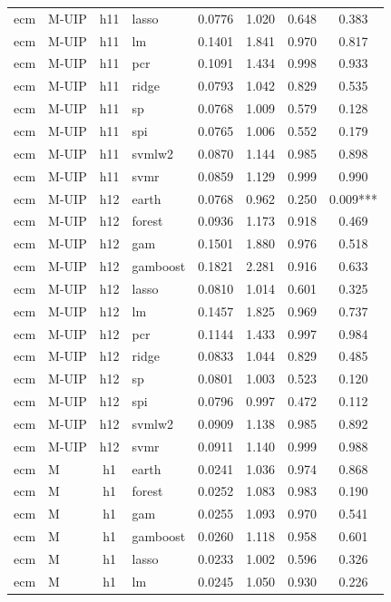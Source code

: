 \begin{ThreePartTable}
\begin{longtable}[t]{llclcccc}
ecm & M-UIP & h11 & lasso & 0.0776 & 1.020 & 0.648 & 0.383\\
ecm & M-UIP & h11 & lm & 0.1401 & 1.841 & 0.970 & 0.817\\
ecm & M-UIP & h11 & pcr & 0.1091 & 1.434 & 0.998 & 0.933\\
ecm & M-UIP & h11 & ridge & 0.0793 & 1.042 & 0.829 & 0.535\\
ecm & M-UIP & h11 & sp & 0.0768 & 1.009 & 0.579 & 0.128\\
ecm & M-UIP & h11 & spi & 0.0765 & 1.006 & 0.552 & 0.179\\
ecm & M-UIP & h11 & svmlw2 & 0.0870 & 1.144 & 0.985 & 0.898\\
ecm & M-UIP & h11 & svmr & 0.0859 & 1.129 & 0.999 & 0.990\\
\addlinespace
ecm & M-UIP & h12 & earth & 0.0768 & 0.962 & 0.250 & 0.009***\\
ecm & M-UIP & h12 & forest & 0.0936 & 1.173 & 0.918 & 0.469\\
ecm & M-UIP & h12 & gam & 0.1501 & 1.880 & 0.976 & 0.518\\
ecm & M-UIP & h12 & gamboost & 0.1821 & 2.281 & 0.916 & 0.633\\
ecm & M-UIP & h12 & lasso & 0.0810 & 1.014 & 0.601 & 0.325\\
ecm & M-UIP & h12 & lm & 0.1457 & 1.825 & 0.969 & 0.737\\
ecm & M-UIP & h12 & pcr & 0.1144 & 1.433 & 0.997 & 0.984\\
ecm & M-UIP & h12 & ridge & 0.0833 & 1.044 & 0.829 & 0.485\\
ecm & M-UIP & h12 & sp & 0.0801 & 1.003 & 0.523 & 0.120\\
ecm & M-UIP & h12 & spi & 0.0796 & 0.997 & 0.472 & 0.112\\
ecm & M-UIP & h12 & svmlw2 & 0.0909 & 1.138 & 0.985 & 0.892\\
ecm & M-UIP & h12 & svmr & 0.0911 & 1.140 & 0.999 & 0.988\\
\addlinespace
ecm & M & h1 & earth & 0.0241 & 1.036 & 0.974 & 0.868\\
ecm & M & h1 & forest & 0.0252 & 1.083 & 0.983 & 0.190\\
ecm & M & h1 & gam & 0.0255 & 1.093 & 0.970 & 0.541\\
ecm & M & h1 & gamboost & 0.0260 & 1.118 & 0.958 & 0.601\\
ecm & M & h1 & lasso & 0.0233 & 1.002 & 0.596 & 0.326\\
ecm & M & h1 & lm & 0.0245 & 1.050 & 0.930 & 0.226\\

\end{longtable}
\end{ThreePartTable}
